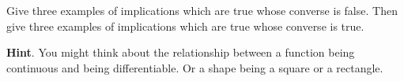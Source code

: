 \documentclass{book}
\begin{document}
\setcounter{cpjt}{13}
\addtocounter{cpjt}{-1}
\begin{activity}\label{activity-8}
\hypertarget{p-167}{}%
Give three examples of implications which are true whose converse is false.  Then give three examples of implications which are true whose converse is true.%
\par\smallskip%
\noindent\textbf{Hint}.\hypertarget{hint-1}{}\quad%
\hypertarget{p-168}{}%
You might think about the relationship between a function being continuous and being differentiable.  Or a shape being a square or a rectangle.%
\end{activity}

\clearpage
\end{document}
